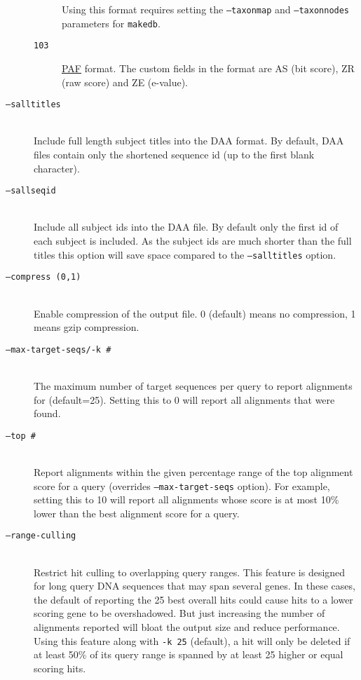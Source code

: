 \documentclass[11pt]{article}
\begin{document}
\begin{description}
\begin{description}
Using this format requires setting the \texttt{--taxonmap} and \texttt{--taxonnodes} parameters for \texttt{makedb}.
\item[\texttt{103}]\href{https://github.com/lh3/miniasm/blob/master/PAF.md}{PAF} format. The custom fields in the format are AS (bit score), ZR (raw score) and ZE (e-value).
\end{description}
\item[\texttt{--salltitles}]\hfill\\
Include full length subject titles into the DAA format. By default, DAA files contain only the shortened sequence id (up to the first blank character).
\item[\texttt{--sallseqid}]\hfill\\
Include all subject ids into the DAA file. By default only the first id of each subject is included. As the subject ids are much shorter than the full titles this option will save space compared to the \texttt{--salltitles} option.
\item[\texttt{--compress (0,1)}]\hfill\\
Enable compression of the output file. 0 (default) means no compression, 1 means gzip compression.
\item[\texttt{--max-target-seqs/-k \#}]\hfill\\
The maximum number of target sequences per query to report alignments for (default=25). Setting this to 0 will report all alignments that were found.
\item[\texttt{--top \#}]\hfill\\
Report alignments within the given percentage range of the top alignment score for a query (overrides \texttt{--max-target-seqs} option). For example, setting this to 10 will report all alignments whose score is at most 10\% lower than the best alignment score for a query.
\item[\texttt{--range-culling}]\hfill\\
Restrict hit culling to overlapping query ranges. This feature is designed for long query DNA sequences that may span several genes. In these cases, the default of reporting the 25 best overall hits could cause hits to a lower scoring gene to be overshadowed. But just increasing the number of alignments reported will bloat the output size and reduce performance.\\
Using this feature along with \texttt{-k 25} (default), a hit will only be deleted if at least 50\% of its query range is spanned by at least 25 higher or equal scoring hits.\\

\end{description}
\end{document}
